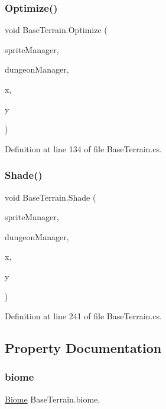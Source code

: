 \subsubsection{\texorpdfstring{Optimize()}{Optimize()}}
{\footnotesize\ttfamily void Base\+Terrain.\+Optimize (\begin{DoxyParamCaption}\item[{\mbox{\hyperlink{class_sprite_manager}{Sprite\+Manager}}}]{sprite\+Manager,  }\item[{\mbox{\hyperlink{class_dungeon_manager}{Dungeon\+Manager}}}]{dungeon\+Manager,  }\item[{int}]{x,  }\item[{int}]{y }\end{DoxyParamCaption})}



Definition at line 134 of file Base\+Terrain.\+cs.

\mbox{\label{class_base_terrain_ac52fb05dde7ffc3a3d88af0122516052}} 
\subsubsection{\texorpdfstring{Shade()}{Shade()}}
{\footnotesize\ttfamily void Base\+Terrain.\+Shade (\begin{DoxyParamCaption}\item[{\mbox{\hyperlink{class_sprite_manager}{Sprite\+Manager}}}]{sprite\+Manager,  }\item[{\mbox{\hyperlink{class_dungeon_manager}{Dungeon\+Manager}}}]{dungeon\+Manager,  }\item[{int}]{x,  }\item[{int}]{y }\end{DoxyParamCaption})}



Definition at line 241 of file Base\+Terrain.\+cs.



\subsection{Property Documentation}
\mbox{\label{class_base_terrain_a89f7a3d77182f51a257cf1f503bb6fe9}} 
\subsubsection{\texorpdfstring{biome}{biome}}
{\footnotesize\ttfamily \mbox{\hyperlink{class_biome}{Biome}} Base\+Terrain.\+biome\hspace{0.3cm}{\ttfamily [get]}, {\ttfamily [set]}}



